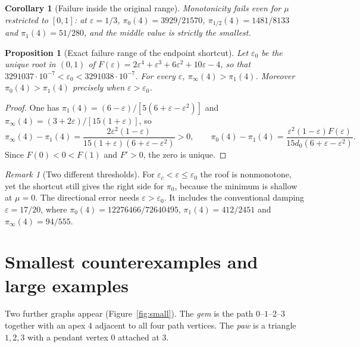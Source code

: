 \documentclass[11pt,a4paper]{article}
\newtheorem{proposition}[theorem]{Proposition}
\newtheorem{corollary}[theorem]{Corollary}
\theoremstyle{definition}\newtheorem{conjecture}{Conjecture}
\theoremstyle{remark}\newtheorem{remark}[theorem]{Remark}
\newcommand{\eps}{\varepsilon}
\begin{document}
\begin{corollary}[Failure inside the original range]\label{cor:unit}
Monotonicity fails even for $\mu$ restricted to $[0,1]$: at $\eps=1/3$,
$\pi_0(4)=3929/21570$, $\pi_{1/2}(4)=1481/8133$ and $\pi_1(4)=51/280$, and the middle value is strictly the smallest.
\end{corollary}

\begin{proposition}[Exact failure range of the endpoint shortcut]\label{prop:shortcut}
Let $\eps_0$ be the unique root in $(0,1)$ of $F(\eps)=2\eps^4+\eps^3+6\eps^2+10\eps-4$, so that $3291037\cdot10^{-7}<\eps_0<3291038\cdot10^{-7}$. For every $\eps$, $\pi_\infty(4)>\pi_1(4)$. Moreover $\pi_0(4)>\pi_1(4)$ precisely when $\eps>\eps_0$.
\end{proposition}
\begin{proof}
One has $\pi_1(4)=(6-\eps)/[5(6+\eps-\eps^2)]$ and $\pi_\infty(4)=(3+2\eps)/[15(1+\eps)]$, so
\[
 \pi_\infty(4)-\pi_1(4)=\frac{2\eps^2(1-\eps)}{15(1+\eps)(6+\eps-\eps^2)}>0,\qquad
 \pi_0(4)-\pi_1(4)=\frac{\eps^2(1-\eps)F(\eps)}{15d_0(6+\eps-\eps^2)}.
\]
Since $F(0)<0<F(1)$ and $F'>0$, the zero is unique.
\end{proof}

\begin{remark}[Two different thresholds]
For $\eps_c<\eps\leq\eps_0$ the roof is nonmonotone, yet the shortcut still gives the right side for $\pi_0$, because the minimum is shallow at $\mu=0$. The directional error needs $\eps>\eps_0$. It includes the conventional damping $\eps=17/20$, where $\pi_0(4)=12276466/72640495$, $\pi_1(4)=412/2451$ and $\pi_\infty(4)=94/555$.
\end{remark}

\section{Smallest counterexamples and large examples}\label{sec:minimal}
Two further graphs appear (Figure~\ref{fig:small}). The \emph{gem} is the path $0$--$1$--$2$--$3$ together with an apex $4$ adjacent to all four path vertices. The \emph{paw} is a triangle $1,2,3$ with a pendant vertex $0$ attached at $3$.
\end{document}
